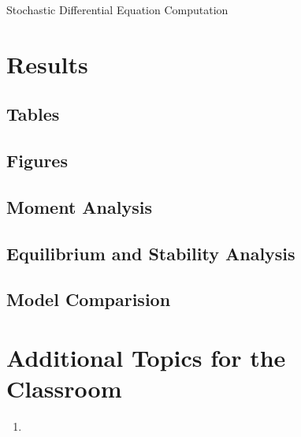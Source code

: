 \begin{algorithm}[H]
\begin{algorithmic}[1]
\end{algorithmic}
\caption{Stochastic Differential Equation Computation}
	\label{Algorithm_2}
\end{algorithm}

\section{Results}

\subsection{Tables}

\subsection{Figures}

\subsection{Moment Analysis}
\subsection{Equilibrium and Stability Analysis}
\subsection{Model Comparision}

\section{Additional Topics for the Classroom}

\begin{enumerate}
\item 
\end{enumerate}



\begin{thebibliography}{00}
\tiny

\end{thebibliography}


